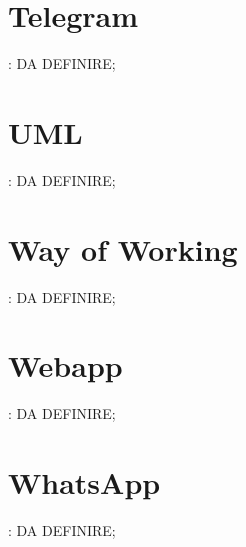 \section{Telegram}: DA DEFINIRE;
\section{UML}: DA DEFINIRE;
\section{Way of Working}: DA DEFINIRE;
\section{Webapp}: DA DEFINIRE;
\section{WhatsApp}: DA DEFINIRE;
